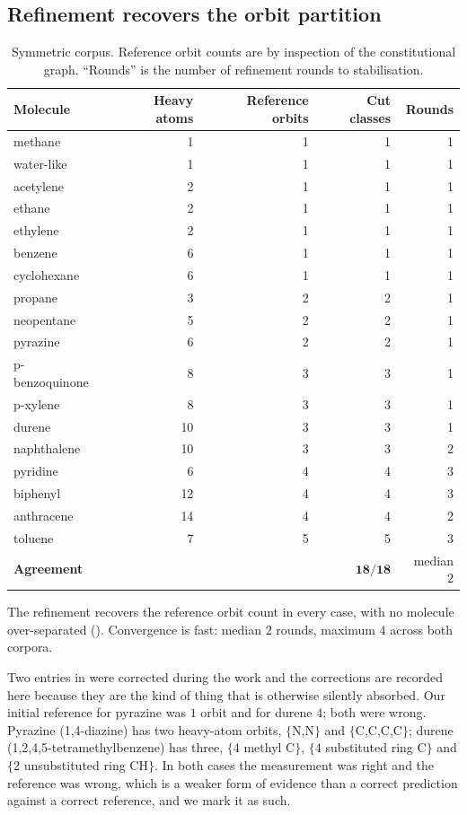 \documentclass[11pt,twocolumn,a4paper]{article}
\theoremstyle{crthm}
\theoremstyle{definition}
\theoremstyle{remark}
\begin{document}
\subsection{Refinement recovers the orbit partition}

\begin{table}[htbp]
\centering\small
\caption{Symmetric corpus. Reference orbit counts are by inspection of
the constitutional graph. ``Rounds'' is the number of refinement rounds
to stabilisation.}
\label{tab:orbits}
\begin{tabular}{@{}lrrrr@{}}
\toprule
Molecule & Heavy atoms & Reference orbits & Cut classes & Rounds\\
\midrule
methane          &  1 & 1 & 1 & 1\\
water-like       &  1 & 1 & 1 & 1\\
acetylene        &  2 & 1 & 1 & 1\\
ethane           &  2 & 1 & 1 & 1\\
ethylene         &  2 & 1 & 1 & 1\\
benzene          &  6 & 1 & 1 & 1\\
cyclohexane      &  6 & 1 & 1 & 1\\
propane          &  3 & 2 & 2 & 1\\
neopentane       &  5 & 2 & 2 & 1\\
pyrazine         &  6 & 2 & 2 & 1\\
p-benzoquinone   &  8 & 3 & 3 & 1\\
p-xylene         &  8 & 3 & 3 & 1\\
durene           & 10 & 3 & 3 & 1\\
naphthalene      & 10 & 3 & 3 & 2\\
pyridine         &  6 & 4 & 4 & 3\\
biphenyl         & 12 & 4 & 4 & 3\\
anthracene       & 14 & 4 & 4 & 2\\
toluene          &  7 & 5 & 5 & 3\\
\midrule
\textbf{Agreement} & & & $\mathbf{18/18}$ & median $2$\\
\bottomrule
\end{tabular}
\end{table}

The refinement recovers the reference orbit count in every case, with no
molecule over-separated (). Convergence is fast: median
$2$ rounds, maximum $4$ across both corpora.

Two entries in  were corrected during the work and the
corrections are recorded here because they are the kind of thing that is
otherwise silently absorbed. Our initial reference for pyrazine was
$1$ orbit and for durene $4$; both were wrong. Pyrazine
(1,4-diazine) has two heavy-atom orbits, $\{$N,N$\}$ and
$\{$C,C,C,C$\}$; durene (1,2,4,5-tetramethylbenzene) has three,
$\{$4 methyl C$\}$, $\{$4 substituted ring C$\}$ and
$\{$2 unsubstituted ring CH$\}$. In both cases the measurement was right
and the reference was wrong, which is a weaker form of evidence than a
correct prediction against a correct reference, and we mark it as such.
\end{document}
